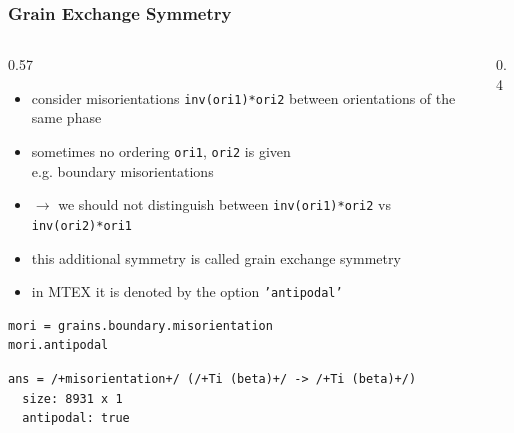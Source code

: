 \documentclass[compress,aspectratio=1610,fleqn]{beamer}
\begin{document}
\begin{frame}[fragile]
  \frametitle{Grain Exchange Symmetry}

  \begin{columns}
    \begin{column}{0.57\textwidth}
  \begin{itemize}
  \item consider misorientations \texttt{inv(ori1)*ori2} between orientations
    of the same phase
  \item sometimes no ordering \texttt{ori1}, \texttt{ori2} is given\\
    e.g. boundary misorientations
  \item $\rightarrow$ we should not distinguish between
    \texttt{inv(ori1)*ori2} \; vs \; \texttt{inv(ori2)*ori1}
  \item this additional symmetry is called grain exchange symmetry
  \item in MTEX it is denoted by the option \texttt{'antipodal'}
  \end{itemize}
  \begin{lstlisting}[style=input]
mori = grains.boundary.misorientation
mori.antipodal
\end{lstlisting}
\vspace{-0.2cm}
\begin{lstlisting}[style=output]
ans = /+misorientation+/ (/+Ti (beta)+/ -> /+Ti (beta)+/)
  size: 8931 x 1
  antipodal: true
\end{lstlisting}

\end{column}
\begin{column}{0.4\textwidth}

\end{column}
\end{columns}


\end{frame}
\end{document}

